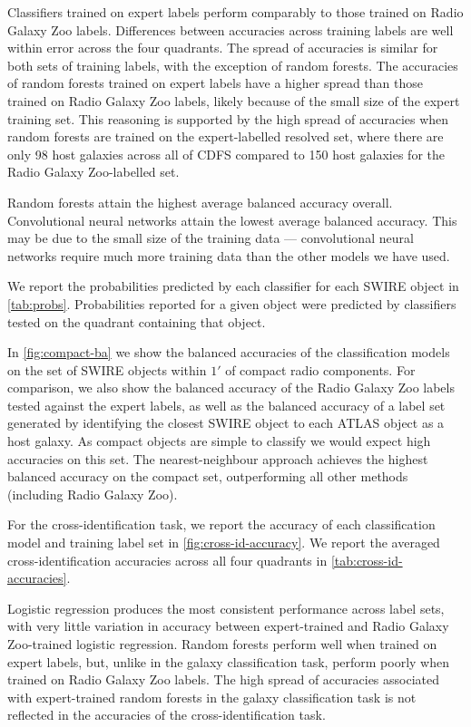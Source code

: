 \documentclass[fleqn,usenatbib,usedcolumn]{mnras}
\begin{document}
    Classifiers trained on expert labels perform comparably to those trained
    on Radio Galaxy Zoo labels. Differences between accuracies across training
    labels are well within error across the four quadrants. The spread of
    accuracies is similar for both sets of training labels, with the exception
    of random forests. The accuracies of random forests trained on expert
    labels have a higher spread than those trained on Radio Galaxy Zoo labels,
    likely because of the small size of the expert training set. This
    reasoning is supported by the high spread of accuracies when random
    forests are trained on the expert-labelled resolved set, where there are
    only 98 host galaxies across all of CDFS compared to 150 host galaxies for
    the Radio Galaxy Zoo-labelled set.

    Random forests attain the highest average balanced accuracy overall.
    Convolutional neural networks attain the lowest average balanced accuracy.
    This may be due to the small size of the training data --- convolutional
    neural networks require much more training data than the other models we
    have used.

    We report the probabilities predicted by each classifier for each SWIRE
    object in \autoref{tab:probs}. Probabilities reported for a given object
    were predicted by classifiers tested on the quadrant containing that
    object.

    In \autoref{fig:compact-ba} we show the balanced accuracies of the
    classification models on the set of SWIRE objects within $1'$ of compact
    radio components. For comparison, we also show the balanced accuracy of
    the Radio Galaxy Zoo labels tested against the expert labels, as well as
    the balanced accuracy of a label set generated by identifying the closest
    SWIRE object to each ATLAS object as a host galaxy. As compact objects are
    simple to classify we would expect high accuracies on this set. The
    nearest-neighbour approach achieves the highest balanced accuracy on the
    compact set, outperforming all other methods (including Radio Galaxy Zoo).

    For the cross-identification task, we report the accuracy of each
    classification model and training label set in
    \autoref{fig:cross-id-accuracy}. We report the averaged
    cross-identification accuracies across all four quadrants in
    \autoref{tab:cross-id-accuracies}.

    Logistic regression produces the most consistent performance across label
    sets, with very little variation in accuracy between expert-trained and
    Radio Galaxy Zoo-trained logistic regression. Random forests perform well
    when trained on expert labels, but, unlike in the galaxy classification
    task, perform poorly when trained on Radio Galaxy Zoo labels. The high
    spread of accuracies associated with expert-trained random forests in the
    galaxy classification task is not reflected in the accuracies of the
    cross-identification task.
\end{document}
